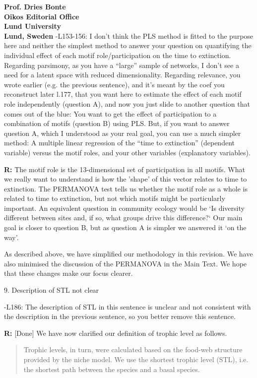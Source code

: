 \documentclass[12pt]{letter}
\begin{document}
\begin{letter}{\bf Prof. Dries Bonte\\
Oikos Editorial Office \\
Lund University \\
Lund, Sweden}
        -L153-156:  I don’t think the PLS method is fitted to the purpose here and neither the simplest method to answer your question on quantifying the individual effect of each motif role/participation on the time to extinction. Regarding parsimony, as you have a ``large'' sample of networks, I don’t see a need for a latent space with reduced dimensionality. Regarding relevance, you wrote earlier (e.g. the previous sentence), and it’s meant by the coef you reconstruct later l.177, that you want here to estimate the effect of each motif role independently (question A), and now you just slide to another question that comes out of the blue: You want to get the effect of participation to a combination of motifs (question B) using PLS. But, if you want to answer question A, which I understood as your real goal, you can use a much simpler method: A multiple linear regression of the ``time to extinction'' (dependent variable) versus the motif roles, and your other variables (explanatory variables).
        
        \textbf{R:}
        The motif role is the 13-dimensional set of participation in all motifs. What we really want to understand is how the 'shape' of this vector relates to time to extinction. 
        The PERMANOVA test tells us whether the motif role as a whole is related to time to extinction, but not which motifs might be particularly important. 
        An equivalent question in community ecology would be `Is diversity different between sites and, if so, what groups drive this difference?` 
        Our main goal is closer to question B, but as question A is simpler we answered it `on the way'.


        As described above, we have simplified our methodology in this revision.
        We have also minimised the discussion of the PERMANOVA in the Main Text.
        We hope that these changes make our focus clearer.
    

    9. Description of STL not clear

      -L186: The description of STL in this sentence is unclear and not consistent with the description in the previous sentence, so you better remove this sentence.

      \textbf{R:} [Done]
      We have now clarified our definition of trophic level as follows.
      
      \begin{quotation}
        Trophic levels, in turn, were calculated based on the food-web structure provided by the niche model. We use the shortest trophic level (STL), i.e. the shortest path between the species and a basal species.
      \end{quotation}
      

\end{letter}
\end{document}
